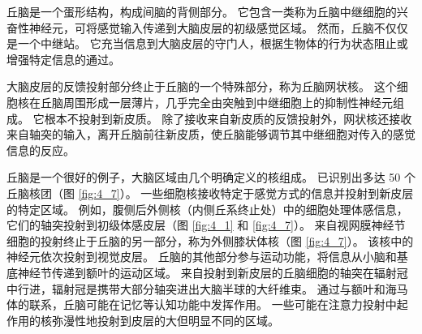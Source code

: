 丘脑是一个蛋形结构，构成间脑的背侧部分。 
它包含一类称为丘脑中继细胞的兴奋性神经元，可将感觉输入传递到大脑皮层的初级感觉区域。 
然而，丘脑不仅仅是一个中继站。 
它充当信息到大脑皮层的守门人，根据生物体的行为状态阻止或增强特定信息的通过。


大脑皮层的反馈投射部分终止于丘脑的一个特殊部分，称为丘脑网状核。 
这个细胞核在丘脑周围形成一层薄片，几乎完全由突触到中继细胞上的抑制性神经元组成。 
它根本不投射到新皮质。 
除了接收来自新皮质的反馈投射外，网状核还接收来自轴突的输入，离开丘脑前往新皮质，使丘脑能够调节其中继细胞对传入的感觉信息的反应。


丘脑是一个很好的例子，大脑区域由几个明确定义的核组成。 已识别出多达 50 个丘脑核团（图 \ref{fig:4_7}）。 
一些细胞核接收特定于感觉方式的信息并投射到新皮层的特定区域。 
例如，腹侧后外侧核（内侧丘系终止处）中的细胞处理体感信息，它们的轴突投射到初级体感皮层（图 \ref{fig:4_1} 和 \ref{fig:4_7}）。 
来自视网膜神经节细胞的投射终止于丘脑的另一部分，称为外侧膝状体核（图 \ref{fig:4_7}）。 
该核中的神经元依次投射到视觉皮层。 
丘脑的其他部分参与运动功能，将信息从小脑和基底神经节传递到额叶的运动区域。 
来自投射到新皮层的丘脑细胞的轴突在辐射冠中行进，辐射冠是携带大部分轴突进出大脑半球的大纤维束。 
通过与额叶和海马体的联系，丘脑可能在记忆等认知功能中发挥作用。 
一些可能在注意力投射中起作用的核弥漫性地投射到皮层的大但明显不同的区域。


